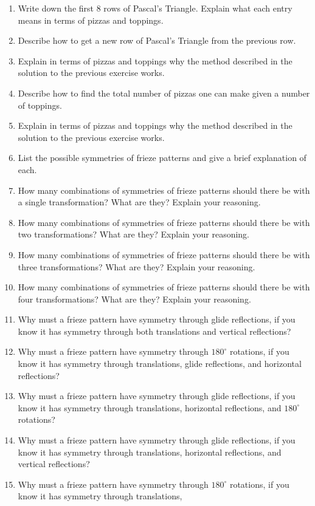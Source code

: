 \begin{enumerate}
\item Write down the first $8$ rows of Pascal's Triangle. Explain what
  each entry means in terms of pizzas and toppings.
\item Describe how to get a new row of Pascal's Triangle from the
  previous row. 
\item Explain in terms of pizzas and toppings why the method described
  in the solution to the previous exercise works.
\item Describe how to find the total number of pizzas one can make
  given a number of toppings.
\item Explain in terms of pizzas and toppings why the method described
  in the solution to the previous exercise works.
\item List the possible symmetries of frieze patterns and give a brief
  explanation of each.
\item How many combinations of symmetries of frieze patterns should
  there be with a single transformation?  What are they? Explain your reasoning.
\item How many combinations of symmetries of frieze patterns should
  there be with two transformations?  What are they? Explain your
  reasoning.
\item How many combinations of symmetries of frieze patterns should
  there be with three transformations?  What are they? Explain your
  reasoning.
\item How many combinations of symmetries of frieze patterns should
  there be with four transformations?  What are they? Explain your
  reasoning.
\item Why must a frieze pattern have symmetry through glide
  reflections, if you know it has symmetry through both translations
  and vertical reflections?
\item Why must a frieze pattern have symmetry through $180^\circ$
  rotations, if you know it has symmetry through translations, glide
  reflections, and horizontal reflections?
\item Why must a frieze pattern have symmetry through glide
  reflections, if you know it has symmetry through translations,
  horizontal reflections, and $180^\circ$ rotations?
\item Why must a frieze pattern have symmetry through glide
  reflections, if you know it has symmetry through translations,
  horizontal reflections, and vertical reflections?
\item Why must a frieze pattern have symmetry through $180^\circ$
  rotations, if you know it has symmetry through translations,

\end{enumerate}
